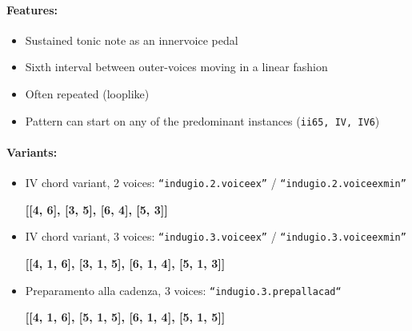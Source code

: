 \documentclass[11pt, openany]{article}
\begin{document}
\paragraph{Features:}
\begin{itemize}
\item Sustained tonic note as an innervoice pedal
\item Sixth interval between outer-voices moving in a linear fashion
\item Often repeated (looplike)
\item Pattern can start on any of the predominant instances (\texttt{ii65, IV, IV6})
\end{itemize}

\paragraph{Variants:}
\begin{itemize}
\item IV chord variant, 2 voices: \texttt{“indugio.2.voiceex”} / \texttt{“indugio.2.voiceexmin”}
	\begin{center}
	\textbf{[[4, 6], [3, 5], [6, 4], [5, 3]]}
	\end{center}
\item IV chord variant, 3 voices: \texttt{“indugio.3.voiceex”} / \texttt{“indugio.3.voiceexmin”}
	\begin{center}
	\textbf{[[4, 1, 6], [3, 1, 5], [6, 1, 4], [5, 1, 3]]}
	\end{center}
\item Preparamento alla cadenza, 3 voices: \texttt{“indugio.3.prepallacad“}
	\begin{center}
	\textbf{[[4, 1, 6], [5, 1, 5], [6, 1, 4], [5, 1, 5]]}
	\end{center}
\end{itemize}
\end{document}
